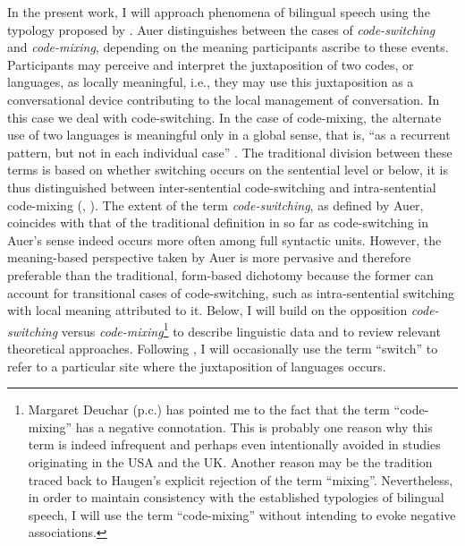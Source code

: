 In the present work, I will approach phenomena of bilingual speech using the typology proposed by \citet{auer-codeswitching-1999}. Auer distinguishes between the cases of \textit{code-switching} and \textit{code-mixing}, depending on the meaning participants ascribe to these events. Participants may perceive and interpret the juxtaposition of two codes, or languages, as locally meaningful, i.e., they may use this juxtaposition as a conversational device contributing to the local management of conversation. In this case  we deal with code-switching. In the case of code-mixing,  the alternate use of two languages is meaningful only in a global sense, that is, ``as a recurrent pattern, but not in each individual case'' \citep[467]{wodak-code-switching-2011}. The traditional division between these terms is based on whether switching occurs on the sentential level or below, it is thus distinguished between inter-sentential code-switching and intra-sentential code-mixing (\citealt[cf.][467]{wodak-code-switching-2011}, \citealt[70--73]{clyne-dynamics-2003}). The extent of the term \textit{code-switching}, as defined by Auer, coincides with that of the traditional definition in so far as code-switching in Auer's sense indeed occurs more often among full syntactic units. However, the meaning-based perspective taken by Auer is more pervasive and therefore  preferable than the traditional, form-based dichotomy because the former can account for transitional cases of code-switching, such as intra-sentential switching with local meaning attributed to it. Below, I will build on the opposition \textit{code-switching} versus \textit{code-mixing}\footnote{
Margaret Deuchar (p.c.) has pointed me to the fact that the term ``code-mixing'' has a negative connotation. This is probably one reason why this term is indeed infrequent and perhaps even intentionally avoided in studies originating in the USA and the UK. Another reason may be the tradition traced back to Haugen's explicit rejection of the term ``mixing''. Nevertheless, in order to maintain consistency with the established typologies of bilingual speech, I will use the term ``code-mixing'' without intending to evoke negative associations.}
to describe linguistic data and to review relevant theoretical approaches. Following \citet{muysken-bilingual-2000}, I will occasionally use the term ``switch'' to refer to a particular site where the juxtaposition of languages occurs.

